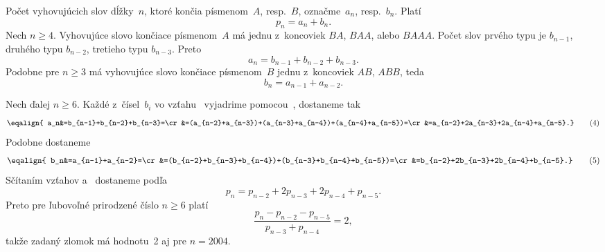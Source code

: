 {%
Počet vyhovujúcich slov dĺžky~$n$, ktoré končia písmenom~$A$, resp.~$B$,
označme~$a_n$, resp.~$b_n$.  Platí
$$
p_n=a_n+b_n.\tag{1}
$$
Nech $n\geq4$. Vyhovujúce slovo končiace písmenom~$A$ má jednu
z~koncoviek $BA$, $BAA$, alebo $BAAA$. Počet slov prvého typu je
$b_{n-1}$, druhého typu $b_{n-2}$, tretieho typu $b_{n-3}$. Preto
$$
a_n=b_{n-1}+b_{n-2}+b_{n-3}.\tag{2}
$$
Podobne pre $n\geq3$ má vyhovujúce slovo končiace písmenom~$B$
jednu z~koncoviek $AB$, $ABB$, teda
$$
b_n=a_{n-1}+a_{n-2}.\tag{3}
$$

Nech ďalej $n\geq6$. Každé z~čísel~$b_i$ vo vzťahu~
vyjadrime pomocou~, dostaneme tak
$$
\eqalign{
a_n&=b_{n-1}+b_{n-2}+b_{n-3}=\cr
   &=(a_{n-2}+a_{n-3})+(a_{n-3}+a_{n-4})+(a_{n-4}+a_{n-5})=\cr
   &=a_{n-2}+2a_{n-3}+2a_{n-4}+a_{n-5}.}\tag{4}
$$
Podobne dostaneme
$$
\eqalign{
b_n&=a_{n-1}+a_{n-2}=\cr
   &=(b_{n-2}+b_{n-3}+b_{n-4})+(b_{n-3}+b_{n-4}+b_{n-5})=\cr
   &=b_{n-2}+2b_{n-3}+2b_{n-4}+b_{n-5}.}\tag{5}
$$
Sčítaním vzťahov  a~ dostaneme podľa~
$$
p_n=p_{n-2}+2p_{n-3}+2p_{n-4}+p_{n-5}.
$$
Preto pre ľubovoľné prirodzené číslo $n\geq6$ platí
$$
\frac{p_n-p_{n-2}-p_{n-5}}{p_{n-3}+p_{n-4}}=2,
$$
takže zadaný zlomok má hodnotu~2 aj pre $n=2004$.}

